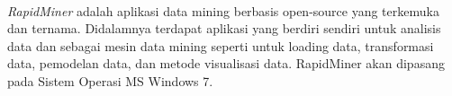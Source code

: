 \paragraph{} \textit{RapidMiner} adalah aplikasi data mining berbasis open-source yang terkemuka dan
ternama. Didalamnya terdapat aplikasi yang berdiri sendiri untuk analisis data dan sebagai
mesin data mining seperti untuk loading data, transformasi data, pemodelan data, dan metode
visualisasi data. RapidMiner akan dipasang pada Sistem Operasi MS Windows 7.\cite{yuda2014data}




